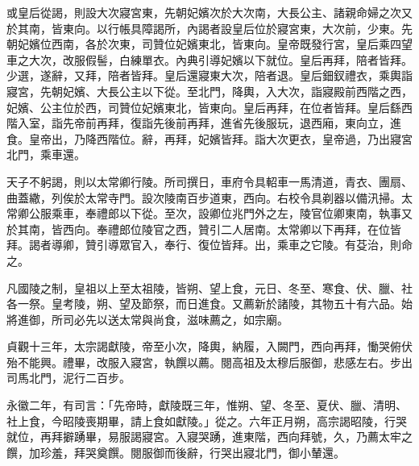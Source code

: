 \begin{pinyinscope}
 或皇后從謁，則設大次寢宮東，先朝妃嬪次於大次南，大長公主、諸親命婦之次又於其南，皆東向。以行帳具障謁所，內謁者設皇后位於寢宮東，大次前，少東。先朝妃嬪位西南，各於次東，司贊位妃嬪東北，皆東向。皇帝既發行宮，皇后乘四望車之大次，改服假髻，白練單衣。內典引導妃嬪以下就位。皇后再拜，陪者皆拜。少選，遂辭，又拜，陪者皆拜。皇后還寢東大次，陪者退。皇后鈿釵禮衣，乘輿詣寢宮，先朝妃嬪、大長公主以下從。至北門，降輿，入大次，詣寢殿前西階之西，妃嬪、公主位於西，司贊位妃嬪東北，皆東向。皇后再拜，在位者皆拜。皇后繇西階入室，詣先帝前再拜，復詣先後前再拜，進省先後服玩，退西廂，東向立，進食。皇帝出，乃降西階位。辭，再拜，妃嬪皆拜。詣大次更衣，皇帝過，乃出寢宮北門，乘車還。



 天子不躬謁，則以太常卿行陵。所司撰日，車府令具軺車一馬清道，青衣、團扇、曲蓋繖，列俟於太常寺門。設次陵南百步道東，西向。右校令具剃器以備汛掃。太常卿公服乘車，奉禮郎以下從。至次，設卿位兆門外之左，陵官位卿東南，執事又於其南，皆西向。奉禮郎位陵官之西，贊引二人居南。太常卿以下再拜，在位皆拜。謁者導卿，贊引導眾官入，奉行、復位皆拜。出，乘車之它陵。有芟治，則命之。



 凡國陵之制，皇祖以上至太祖陵，皆朔、望上食，元日、冬至、寒食、伏、臘、社各一祭。皇考陵，朔、望及節祭，而日進食。又薦新於諸陵，其物五十有六品。始將進御，所司必先以送太常與尚食，滋味薦之，如宗廟。



 貞觀十三年，太宗謁獻陵，帝至小次，降輿，納履，入闕門，西向再拜，慟哭俯伏殆不能興。禮畢，改服入寢宮，執饌以薦。閱高祖及太穆后服御，悲感左右。步出司馬北門，泥行二百步。



 永徽二年，有司言：「先帝時，獻陵既三年，惟朔、望、冬至、夏伏、臘、清明、社上食，今昭陵喪期畢，請上食如獻陵。」從之。六年正月朔，高宗謁昭陵，行哭就位，再拜擗踴畢，易服謁寢宮。入寢哭踴，進東階，西向拜號，久，乃薦太牢之饌，加珍羞，拜哭奠饌。閱服御而後辭，行哭出寢北門，御小輦還。




\end{pinyinscope}
